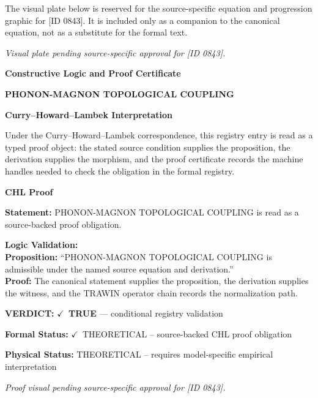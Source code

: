 \begingroup\footnotesize\sloppy
The visual plate below is reserved for the source-specific equation and progression graphic for [ID 0843]. It is included only as a companion to the canonical equation, not as a substitute for the formal text.
\par\endgroup
\begingroup\footnotesize\itshape
Visual plate pending source-specific approval for [ID 0843].
\par\endgroup

\clearpage
\begingroup\tzpsupportsetup
\noindent\textbf{\fontsize{10.8pt}{12.8pt}\selectfont [ID 0843] Constructive Logic and Proof Certificate}\par
\noindent\textbf{\fontsize{10pt}{12pt}\selectfont PHONON-MAGNON TOPOLOGICAL COUPLING}\par
\vspace{0.45em}
\begingroup
\footnotesize
\setlength{\parskip}{0.22em}
\setlength{\parindent}{0pt}
\noindent\textbf{Curry--Howard--Lambek Interpretation}\par
Under the Curry--Howard--Lambek correspondence, this registry entry is read as a typed proof
object: the stated source condition supplies the proposition, the derivation supplies the
morphism, and the proof certificate records the machine handles needed to check the obligation
in the formal registry.

\vspace{0.45em}
\noindent\textbf{CHL Proof}\par
\textbf{Statement:} PHONON-MAGNON TOPOLOGICAL COUPLING is read as a source-backed proof obligation.

\textbf{Logic Validation:}\\
\textbf{Proposition:} ``PHONON-MAGNON TOPOLOGICAL COUPLING is admissible under the named source equation and derivation.''\\
\textbf{Proof:} The canonical statement supplies the proposition, the derivation supplies the witness, and the TRAWIN operator chain records the normalization path.

\textbf{VERDICT:} \ensuremath{\checkmark}\ \textbf{TRUE} --- conditional registry validation

\textbf{Formal Status:} \ensuremath{\checkmark}\ THEORETICAL -- source-backed CHL proof obligation

\textbf{Physical Status:} THEORETICAL -- requires model-specific empirical interpretation
\par\vspace{0.45em}
\par
\vfill
\begingroup\footnotesize\itshape
Proof visual pending source-specific approval for [ID 0843].
\par\endgroup
\vfill
\endgroup
\endgroup
